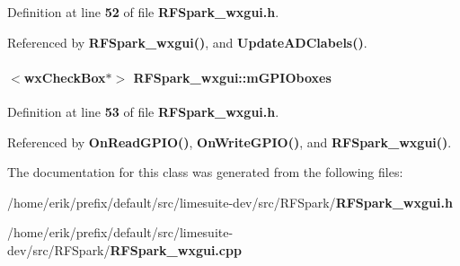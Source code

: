 Definition at line {\bf 52} of file {\bf R\+F\+Spark\+\_\+wxgui.\+h}.



Referenced by {\bf R\+F\+Spark\+\_\+wxgui()}, and {\bf Update\+A\+D\+Clabels()}.

\paragraph[{m\+G\+P\+I\+Oboxes}]{$<$wx\+Check\+Box$\ast$$>$ R\+F\+Spark\+\_\+wxgui\+::m\+G\+P\+I\+Oboxes\hspace{0.3cm}{\ttfamily [protected]}}\label{classRFSpark__wxgui_acf67292b2dfcdbc984b6c6a19cb99060}


Definition at line {\bf 53} of file {\bf R\+F\+Spark\+\_\+wxgui.\+h}.



Referenced by {\bf On\+Read\+G\+P\+I\+O()}, {\bf On\+Write\+G\+P\+I\+O()}, and {\bf R\+F\+Spark\+\_\+wxgui()}.



The documentation for this class was generated from the following files\+:\begin{DoxyCompactItemize}
\item 
/home/erik/prefix/default/src/limesuite-\/dev/src/\+R\+F\+Spark/{\bf R\+F\+Spark\+\_\+wxgui.\+h}\item 
/home/erik/prefix/default/src/limesuite-\/dev/src/\+R\+F\+Spark/{\bf R\+F\+Spark\+\_\+wxgui.\+cpp}\end{DoxyCompactItemize}

